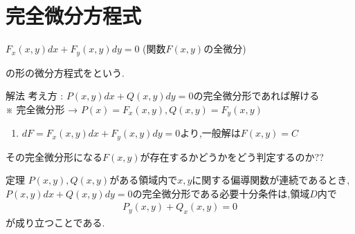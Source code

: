 \documentclass[a4paper]{jsarticle}
\begin{document}
\section{完全微分方程式}
\begin{center}
    $F_x\left(x,y\right)dx+F_y\left(x,y\right)dy=0$ (関数$F\left(x,y\right)$の全微分)
\end{center}
の形の微分方程式をという.
\begin{itembox}[l]{解法}
    考え方 : $P\left(x,y\right)dx+Q\left(x,y\right)dy=0$の完全微分形であれば解ける\\
    ※ 完全微分形 → $P\left(x\right)=F_x\left(x,y\right),Q\left(x,y\right)=F_y\left(x,y\right)$
    \begin{enumerate}[(1)]
        \item  $dF=F_x\left(x,y\right)dx+F_y\left(x,y\right)dy=0$より,一般解は$F\left(x,y\right)=C$
    \end{enumerate}
\end{itembox}
その完全微分形になる$F\left(x,y\right)$が存在するかどうかをどう判定するのか??
\begin{itembox}[l]{定理}
    $P\left(x,y\right),Q\left(x,y\right)$がある領域内で$x,y$に関する偏導関数が連続であるとき,\\
    $P\left(x,y\right)dx+Q\left(x,y\right)dy=0$の完全微分形である必要十分条件は,領域$D$内で
    \begin{eqnarray*}
        P_y\left(x,y\right)+Q_x\left(x,y\right)=0
    \end{eqnarray*}
    が成り立つことである.
\end{itembox}
\end{document}
